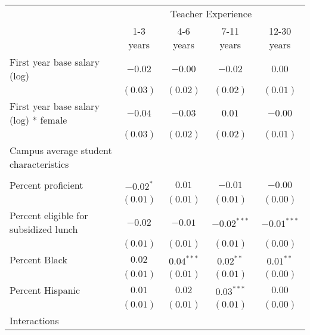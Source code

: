 \documentclass[]{article}
\begin{document}
\begin{table}
\begin{center}
\begin{tabular}{l c c c c }
\hline
 & \multicolumn{4}{c}{Teacher Experience} \\ \cline{2-5}
 & 1-3 years & 4-6 years & 7-11 years & 12-30 years \\
\hline
First year base salary (log)                & $-0.02$     & $-0.00$      & $-0.02$       & $0.00$        \\
                                            & $(0.03)$    & $(0.02)$     & $(0.02)$      & $(0.01)$      \\
First year base salary (log) * female       & $-0.04$     & $-0.03$      & $0.01$        & $-0.00$       \\
                                            & $(0.03)$    & $(0.02)$     & $(0.02)$      & $(0.01)$      \\
Campus average student characteristics      &             &              &               &               \\
                                            &             &              &               &               \\
\quad Percent proficient                    & $-0.02^{*}$ & $0.01$       & $-0.01$       & $-0.00$       \\
                                            & $(0.01)$    & $(0.01)$     & $(0.01)$      & $(0.00)$      \\
\quad Percent eligible for subsidized lunch & $-0.02$     & $-0.01$      & $-0.02^{***}$ & $-0.01^{***}$ \\
                                            & $(0.01)$    & $(0.01)$     & $(0.01)$      & $(0.00)$      \\
\quad Percent Black                         & $0.02$      & $0.04^{***}$ & $0.02^{**}$   & $0.01^{**}$   \\
                                            & $(0.01)$    & $(0.01)$     & $(0.01)$      & $(0.00)$      \\
\quad Percent Hispanic                      & $0.01$      & $0.02$       & $0.03^{***}$  & $0.00$        \\
                                            & $(0.01)$    & $(0.01)$     & $(0.01)$      & $(0.00)$      \\
Interactions                                &             &              &               &               \\

\end{tabular}
\end{center}
\end{table}
\end{document}
